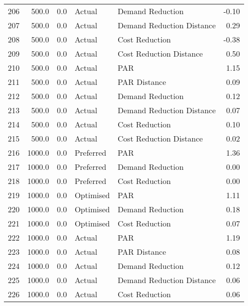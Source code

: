 \begin{longtable}{lrrllr}
206  &        500.0 &     0.0 &         Actual &           Demand Reduction &  -0.10 \\
207  &        500.0 &     0.0 &         Actual &  Demand Reduction Distance &   0.29 \\
208  &        500.0 &     0.0 &         Actual &             Cost Reduction &  -0.38 \\
209  &        500.0 &     0.0 &         Actual &    Cost Reduction Distance &   0.50 \\
210  &        500.0 &     0.0 &         Actual &                        PAR &   1.15 \\
211  &        500.0 &     0.0 &         Actual &               PAR Distance &   0.09 \\
212  &        500.0 &     0.0 &         Actual &           Demand Reduction &   0.12 \\
213  &        500.0 &     0.0 &         Actual &  Demand Reduction Distance &   0.07 \\
214  &        500.0 &     0.0 &         Actual &             Cost Reduction &   0.10 \\
215  &        500.0 &     0.0 &         Actual &    Cost Reduction Distance &   0.02 \\
216  &       1000.0 &     0.0 &      Preferred &                        PAR &   1.36 \\
217  &       1000.0 &     0.0 &      Preferred &           Demand Reduction &   0.00 \\
218  &       1000.0 &     0.0 &      Preferred &             Cost Reduction &   0.00 \\
219  &       1000.0 &     0.0 &      Optimised &                        PAR &   1.11 \\
220  &       1000.0 &     0.0 &      Optimised &           Demand Reduction &   0.18 \\
221  &       1000.0 &     0.0 &      Optimised &             Cost Reduction &   0.07 \\
222  &       1000.0 &     0.0 &         Actual &                        PAR &   1.19 \\
223  &       1000.0 &     0.0 &         Actual &               PAR Distance &   0.08 \\
224  &       1000.0 &     0.0 &         Actual &           Demand Reduction &   0.12 \\
225  &       1000.0 &     0.0 &         Actual &  Demand Reduction Distance &   0.06 \\
226  &       1000.0 &     0.0 &         Actual &             Cost Reduction &   0.06 \\

\end{longtable}
